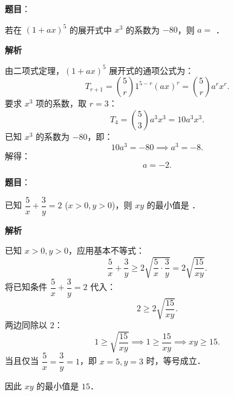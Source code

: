 \begin{answer}

\textbf{题目}：

若在 $(1 + ax)^5$ 的展开式中 $x^3$ 的系数为 $-80$，则 $a =$ \gkblank{}．

\textbf{解析}

由二项式定理，$(1 + ax)^5$ 展开式的通项公式为：
\nopagebreak[4]
\[
T_{r+1} = \binom{5}{r} 1^{5-r} (ax)^r = \binom{5}{r} a^r x^r.
\]
要求 $x^3$ 项的系数，取 $r = 3$：
\nopagebreak[4]
\[
T_4 = \binom{5}{3} a^3 x^3 = 10a^3 x^3.
\]
已知 $x^3$ 的系数为 $-80$，即：
\nopagebreak[4]
\[
10a^3 = -80 \implies a^3 = -8.
\]
解得：
\nopagebreak[4]
\[
a = -2.
\]


\end{answer}
\begin{answer}

\textbf{题目}：

已知 $\dfrac{5}{x} + \dfrac{3}{y} = 2$ ($x > 0, y > 0$)，则 $xy$ 的最小值是 \gkblank{}．

\textbf{解析}

已知 $x > 0, y > 0$，应用基本不等式：
\nopagebreak[4]
\[
\frac{5}{x} + \frac{3}{y} \geqslant 2\sqrt{\frac{5}{x} \cdot \frac{3}{y}} = 2\sqrt{\frac{15}{xy}}.
\]
将已知条件 $\dfrac{5}{x} + \dfrac{3}{y} = 2$ 代入：
\nopagebreak[4]
\[
2 \geqslant 2\sqrt{\frac{15}{xy}}.
\]
两边同除以 $2$：
\nopagebreak[4]
\[
1 \geqslant \sqrt{\frac{15}{xy}} \implies 1 \geqslant \frac{15}{xy} \implies xy \geqslant 15.
\]
当且仅当 $\dfrac{5}{x} = \dfrac{3}{y} = 1$，即 $x = 5, y = 3$ 时，等号成立．

因此 $xy$ 的最小值是 $15$．


\end{answer}
